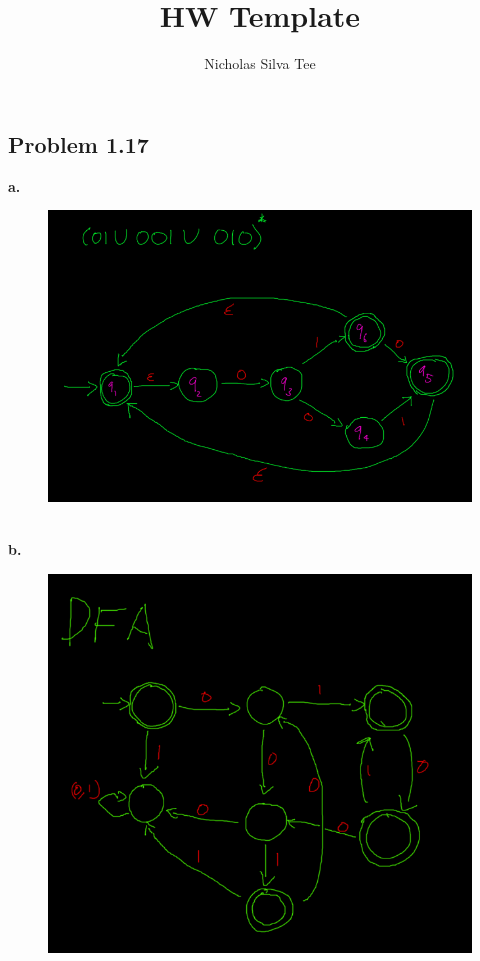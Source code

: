 \documentclass[letter]{article}
\title{HW Template}
\author{Nicholas Silva Tee}
\theoremstyle{case}
\begin{document}
\subsection*{Problem 1.17}
\textbf{a. }
\begin{figure}[h!]
	\includegraphics[scale=0.4]{nfa.png}
\end{figure} \\ 

\textbf{b. }
\begin{figure}[h!]
	\includegraphics[scale=0.4]{dfa.png}
\end{figure}
\newpage
\end{document}
